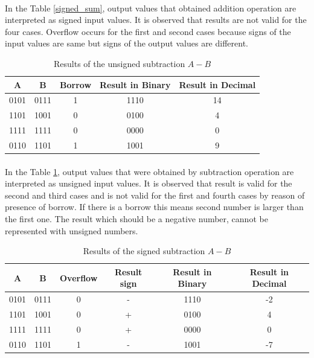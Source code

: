 \documentclass[pdftex,12pt,a4paper]{article}
\begin{document}
\begin{flushleft}
\paragraph{}
In the Table \ref{signed_sum}, output values that obtained addition operation are interpreted as signed input values. It is observed that results are not valid for the four cases. Overflow occurs for the first and second cases because signs of the input values are same but signs of the output values are different. 
\begin{table}[!h]
\begin{center}
    \begin{tabular}{|c|c|c|c|c|}
    \hline
         A & B & Borrow & Result in Binary & Result in Decimal \\
         \hline
         0101 & 0111 & 1 & 1110 & 14 \\
         \hline
         1101 & 1001 & 0 & 0100 & 4 \\
         \hline
         1111 & 1111 & 0 & 0000 & 0 \\
         \hline
         0110 & 1101 & 1 & 1001 & 9 \\
         \hline
        \end{tabular}
    \caption{Results of the unsigned subtraction $A - B$}
    \label{unsigned_subtract}
\end{center}
\end{table}

\paragraph{}
In the Table \ref{unsigned_subtract}, output values that were obtained by subtraction operation are interpreted as unsigned input values. It is observed that result is  valid for the second and third cases and is not valid for the first and fourth cases by reason of presence of borrow. If there is a borrow this means second number is larger than the first one. The result which should be a negative number, cannot be represented with unsigned numbers.

\begin{table}[!h]
\begin{center}
    \begin{tabular}{|c|c|c|c|c|c|}
    \hline
         A & B & Overflow & Result sign & Result in Binary & Result in Decimal \\
         \hline
         0101 & 0111 & 0 & - & 1110 & -2 \\
         \hline
         1101 & 1001 & 0 & + & 0100 & 4 \\
         \hline
         1111 & 1111 & 0 & + & 0000 & 0 \\
         \hline
         0110 & 1101 & 1 & - & 1001 & -7 \\
         \hline
        \end{tabular}
    \caption{Results of the signed subtraction $A - B$}
    \label{signed_subtraction}
\end{center}
\end{table}


\end{flushleft}
\end{document}
